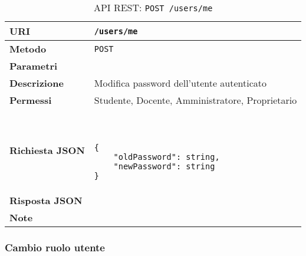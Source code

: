         \begin{table}[H]
            \begin{center}
                \begin{tabular}{p{} p{}}
                    \toprule
                    \textbf{URI} & \texttt{/users/me} \\ \midrule
                    \textbf{Metodo} & \texttt{POST} \\ \midrule
                    \textbf{Parametri} & \\ \midrule
                    \textbf{Descrizione} & Modifica password dell'utente autenticato \\ \midrule
                    \textbf{Permessi} & Studente, Docente, Amministratore, Proprietario  \\ \midrule
                    \textbf{Richiesta JSON} & \
                        \begin{lstlisting}[basicstyle={\ttfamily}]
{
    "oldPassword": string,
    "newPassword": string
}
                        \end{lstlisting}
                        \\ \midrule
                    \textbf{Risposta JSON} & \\ \midrule
                    \textbf{Note} & \\
                    \bottomrule
                \end{tabular}
                \caption{API REST: \texttt{POST /users/me}}
            \end{center}
        \end{table}

    \subsubsection{Cambio ruolo utente}

